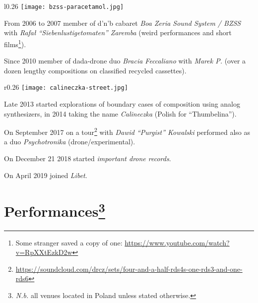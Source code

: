 \documentclass[a4paper]{article}
\begin{document}
\vspace{7mm}

\begin{wrapfigure}[5]{l}{0.26\textwidth}
  \vspace{-5mm}
  \centering
  \texttt{[image: bzss-paracetamol.jpg]}
\end{wrapfigure}

\vspace{4mm}

From 2006 to 2007 member of d'n'b cabaret \emph{Boa Zeria Sound System / BZSS} with \emph{Rafał ``Siebenlustigetomaten'' Zaremba} (weird performances and short films\footnote{Some stranger saved a copy of one: \url{https://www.youtube.com/watch?v=RpXXtEzkD2w}}).

\vspace{4mm}
Since 2010 member of dada-drone duo \emph{Bracia Feccaliano} with \emph{Marek P.} (over a dozen lengthy compositions on classified recycled cassettes).

\vspace{13mm}

\begin{wrapfigure}[4]{r}{0.26\textwidth}
  \vspace{-5mm}
  \centering
  \texttt{[image: calineczka-street.jpg]}
\end{wrapfigure}

Late 2013 started explorations of boundary cases of composition using analog synthesizers, in 2014 taking the name \emph{Calineczka} (Polish for ``Thumbelina'').

\vspace{4mm}
On September 2017 on a tour\footnote{\url{https://soundcloud.com/drcz/sets/four-and-a-half-rds4s-one-rds3-and-one-rds6}} with \emph{Dawid ``Purgist'' Kowalski} performed also as a duo \emph{Psychotronika} (drone/experimental).

\vspace{4mm}
On December 21 2018 started \emph{important drone records}.

\vspace{4mm}
On April 2019 joined \emph{Libet}.


\newpage

\section*{Performances\footnote{\emph{N.b.} all venues located in Poland unless stated otherwise.}}
\end{document}
